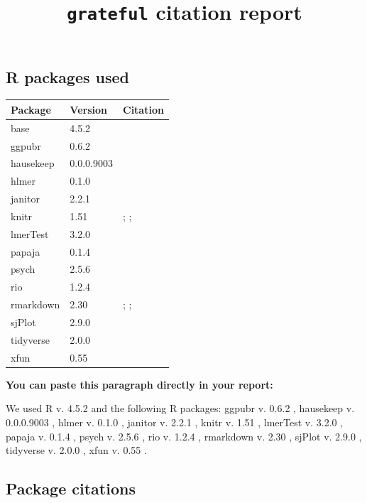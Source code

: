 \documentclass[
]{article}
\title{\texttt{grateful} citation report}
\author{}
\date{\vspace{-2.5em}}
\begin{document}
\maketitle

\subsection{R packages used}\label{r-packages-used}

\begin{longtable}[]{@{}lll@{}}
\toprule\noalign{}
Package & Version & Citation \\
\midrule\noalign{}
\endhead
\bottomrule\noalign{}
\endlastfoot
base & 4.5.2 & \citet{base} \\
ggpubr & 0.6.2 & \citet{ggpubr} \\
hausekeep & 0.0.0.9003 & \citet{hausekeep} \\
hlmer & 0.1.0 & \citet{hlmer} \\
janitor & 2.2.1 & \citet{janitor} \\
knitr & 1.51 & \citet{knitr2014}; \citet{knitr2015};
\citet{knitr2025} \\
lmerTest & 3.2.0 & \citet{lmerTest} \\
papaja & 0.1.4 & \citet{papaja} \\
psych & 2.5.6 & \citet{psych} \\
rio & 1.2.4 & \citet{rio} \\
rmarkdown & 2.30 & \citet{rmarkdown2018}; \citet{rmarkdown2020};
\citet{rmarkdown2025} \\
sjPlot & 2.9.0 & \citet{sjPlot} \\
tidyverse & 2.0.0 & \citet{tidyverse} \\
xfun & 0.55 & \citet{xfun} \\
\end{longtable}

\textbf{You can paste this paragraph directly in your report:}

We used R v. 4.5.2 \citep{base} and the following R packages: ggpubr v.
0.6.2 \citep{ggpubr}, hausekeep v. 0.0.0.9003 \citep{hausekeep}, hlmer
v. 0.1.0 \citep{hlmer}, janitor v. 2.2.1 \citep{janitor}, knitr v. 1.51
\citep{knitr2014, knitr2015, knitr2025}, lmerTest v. 3.2.0
\citep{lmerTest}, papaja v. 0.1.4 \citep{papaja}, psych v. 2.5.6
\citep{psych}, rio v. 1.2.4 \citep{rio}, rmarkdown v. 2.30
\citep{rmarkdown2018, rmarkdown2020, rmarkdown2025}, sjPlot v. 2.9.0
\citep{sjPlot}, tidyverse v. 2.0.0 \citep{tidyverse}, xfun v. 0.55
\citep{xfun}.

\subsection{Package citations}\label{package-citations}


\end{document}
